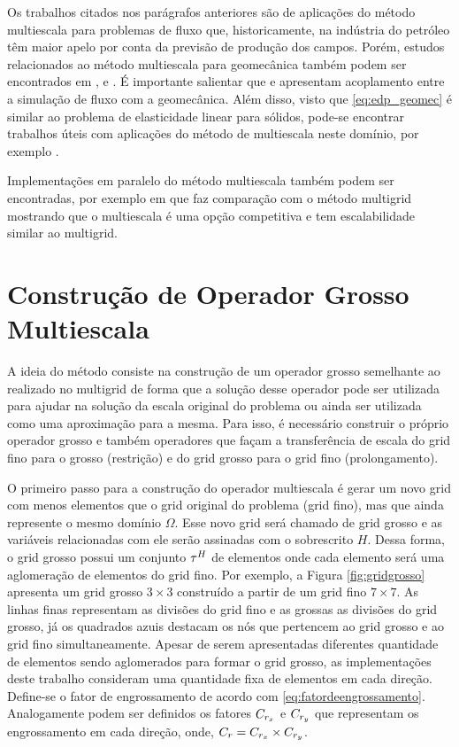 Os trabalhos citados nos parágrafos anteriores são de aplicações do método multiescala para problemas de fluxo que, historicamente, na indústria do petróleo têm maior apelo por conta da previsão de produção dos campos. Porém, estudos relacionados ao método multiescala para geomecânica também podem ser encontrados em \citet{casteletto}, \citet{irina} e \citet{castelettoacoplado}. É importante salientar que \cite{casteletto} e \cite{irina} apresentam acoplamento entre a simulação de fluxo com a geomecânica. Além disso, visto que \eqref{eq:edp_geomec} é similar ao problema de elasticidade linear para sólidos, pode-se encontrar trabalhos úteis com aplicações do método de multiescala neste domínio, por exemplo \citet{mbuck}. 

Implementações em paralelo do método multiescala também podem ser encontradas, por exemplo em \citet{msparalelo} que faz comparação com o método multigrid mostrando que o multiescala é uma opção competitiva e tem escalabilidade similar ao multigrid.

\section{Construção de Operador Grosso Multiescala}

A ideia do método consiste na construção de um operador grosso semelhante ao realizado no multigrid de forma que a solução desse operador pode ser utilizada para ajudar na solução da escala original do problema ou ainda ser utilizada como uma aproximação para a mesma. Para isso, é necessário construir o próprio operador grosso e também operadores que façam a transferência de escala do grid fino para o grosso (restrição) e do grid grosso para o grid fino (prolongamento).


O primeiro passo para a construção do operador multiescala é gerar um novo grid com menos elementos que o grid original do problema (grid fino), mas que ainda represente o mesmo domínio $\Omega$. Esse novo grid será chamado de grid grosso e as variáveis relacionadas com ele serão assinadas com o sobrescrito $H$.
Dessa forma, o grid grosso possui um conjunto $\tau^H$ de elementos onde cada elemento será uma aglomeração de elementos do grid fino. Por exemplo, a Figura \ref{fig:gridgrosso} apresenta um grid grosso $3\times 3$ construído a partir de um grid fino $7\times 7$.  As linhas finas representam as divisões do grid fino e as grossas as divisões do grid grosso, já os  quadrados azuis destacam os nós que pertencem ao grid grosso e ao grid fino simultaneamente. Apesar de serem apresentadas diferentes quantidade de elementos sendo aglomerados para formar o grid grosso, as implementações deste trabalho consideram uma quantidade fixa de elementos em cada direção. Define-se o fator de engrossamento de acordo com \eqref{eq:fatordeengrossamento}. Analogamente podem ser definidos os fatores $C_{r_x}$ e $C_{r_y}$ que representam os engrossamento em cada direção, onde, $C_r = C_{r_x} \times C_{r_y}$.

